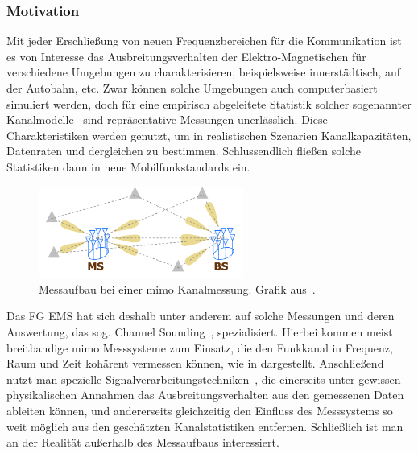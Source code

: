 %
\subsubsection{Motivation}
%
%
Mit jeder Erschlie{\ss}ung von neuen Frequenzbereichen f\"ur die Kommunikation ist es von Interesse das Ausbreitungsverhalten der Elektro-Magnetischen f\"ur verschiedene Umgebungen zu charakterisieren, beispielsweise innerst\"adtisch, auf der Autobahn, etc. Zwar k\"onnen solche Umgebungen auch computerbasiert simuliert werden, doch f\"ur eine empirisch abgeleitete Statistik solcher sogenannter Kanalmodelle~\cite{delgaldo2007phd} sind repr\"asentative Messungen unerl\"asslich. Diese Charakteristiken werden genutzt, um in realistischen Szenarien Kanalkapazit\"aten, Datenraten und dergleichen zu bestimmen. Schlussendlich flie{\ss}en solche Statistiken dann in neue Mobilfunkstandards ein.

\begin{figure}
    \centering\includegraphics[width=0.6\textwidth]{img/eadf/sounding.png}
    \caption{Messaufbau bei einer \acrshort{mimo} Kanalmessung. Grafik aus~\cite{richter_estimation_2005}.}\label{eadf_sounding}
\end{figure}

Das FG EMS hat sich deshalb unter anderem auf solche Messungen und deren Auswertung, das sog. Channel Sounding~\cite{thomae2005multidim_hrpe}, spezialisiert. Hierbei kommen meist breitbandige \gls{mimo} Messsysteme zum Einsatz, die den Funkkanal in Frequenz, Raum und Zeit koh\"arent vermessen k\"onnen, wie in  dargestellt. Anschlie{\ss}end nutzt man spezielle Signalverarbeitungstechniken~\cite{semper2023wideband_channel_sounding}, die einerseits unter gewissen physikalischen Annahmen das Ausbreitungsverhalten aus den gemessenen Daten ableiten k\"onnen, und andererseits gleichzeitig den Einfluss des Messsystems so weit m\"oglich aus den gesch\"atzten Kanalstatistiken entfernen. Schlie{\ss}lich ist man an der Realit\"at au{\ss}erhalb des Messaufbaus interessiert. 

